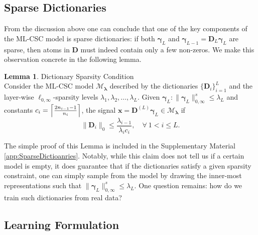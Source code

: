 \documentclass[10pt,journal]{IEEEtran}
\def\x{{\mathbf x}}
\def\D{{\mathbf D}}
\def\M{{\mathcal{M}}}
\def\gama{{\boldsymbol \gamma}}
\def\lamda{{\boldsymbol \lambda}}
\theoremstyle{plain}
\theoremstyle{definition}
\newtheorem{lemma}{Lemma}
\begin{document}
\subsection{Sparse Dictionaries}

From the discussion above one can conclude that one of the key components of the ML-CSC model is sparse dictionaries: if both $\gama_L$ and $\gama_{L-1} = \D_L\gama_L$ are sparse, then atoms in $\D$ must indeed contain only a few non-zeros. We make this observation concrete in the following lemma.

\begin{lemma}{Dictionary Sparsity Condition}\label{lemma:SparseDictionaries} \\
	Consider the ML-CSC model $\M_\lamda$ described by the dictionaries $\{\D_i\}_{i=1}^L$ and the layer-wise $\ell_{0,\infty}$-sparsity levels $\lambda_1,\lambda_2,\dots,\lambda_L$. Given $\gama_L : \|\gama_L\|^s_{0,\infty} \leq \lambda_L$ and constants $c_i = \Bigl\lceil \frac{2n_{i-1}-1}{n_i} \Bigr\rceil$, the signal $\x = \D^{(L)} \gama_L \in \M_\lamda$ if
	\begin{equation}
		\|\D_i\|_0 \leq \frac{\lambda_{i-1}}{\lambda_i c_i}, \quad \forall\ 1<i\leq L.
	\end{equation}
\end{lemma}

The simple proof of this Lemma is included in the Supplementary Material \ref{app:SparseDictioanries}. Notably, while this claim does not tell us if a certain model is empty, it does guarantee that if the dictionaries satisfy a given sparsity constraint, one can simply sample from the model by drawing the inner-most representations such that $\|\gama_L \|^s_{0,\infty}\leq \lambda_L$. One question remains: how do we train such dictionaries from real data?

\subsection{Learning Formulation}
\label{subsec:Learning}
\end{document}
